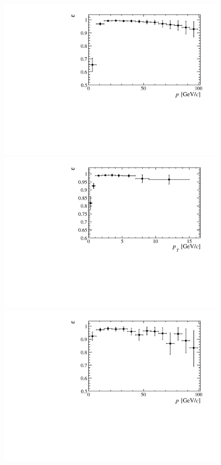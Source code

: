 \begin{figure}[!h]
 \centering
 \includegraphics[trim=0.4cm 0.1cm 0.5cm 0.3cm, clip=true,scale=0.33]{Figures/Chapter3/MvM/vim_efficiency_p.pdf}
 \includegraphics[trim=0.4cm 0.1cm 0.5cm 0.3cm, clip=true,scale=0.33]{Figures/Chapter3/MvM/vim_efficiency_pt.pdf}\\
 \includegraphics[trim=0.4cm 0.1cm 0.5cm 0.3cm, clip=true,scale=0.33]{Figures/Chapter3/MvTTM/vim_efficiency_p.pdf}

\end{figure}
